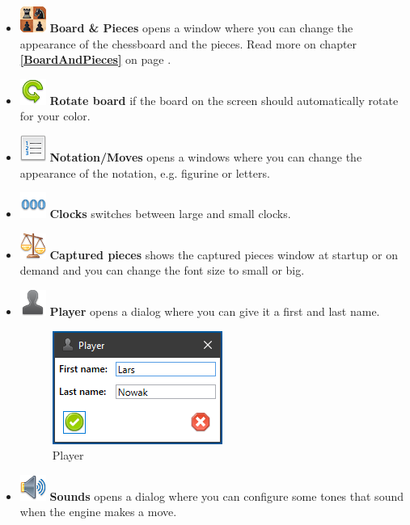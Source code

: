 \documentclass[11pt,a4paper]{article}
\begin{document}
\begin{itemize}
	\item  \includegraphics[scale=0.9]{Board2DPieces32.png} \textbf{Board \& Pieces} opens a window where you can change the appearance of the chessboard and the pieces.  Read more on chapter \textbf{\ref{BoardAndPieces}  } on page \pageref{BoardAndPieces}.
	\item \includegraphics[scale=0.5]{arrow_rotate_anticlockwise.png}  \textbf{Rotate board} if the board on the screen should automatically rotate for your color.
	\item  \includegraphics[scale=0.5]{text_list_numbers.png} \textbf{Notation/Moves} opens a windows where you can change the appearance of the notation, e.g. figurine or letters.
	\item  \includegraphics[scale=0.5]{digit_separator.png}  \textbf{Clocks} switches between large and small clocks.
	\item  \includegraphics[scale=0.5]{balance_unbalance.png}  \textbf{Captured pieces} shows the captured pieces window at startup or on demand and you can change the font size to small or big.
	\item  \includegraphics[scale=0.5]{user_silhouette.png}  \textbf{Player} opens a dialog where you can give it a first and last name.	
    \begin{figure}[H]
	   \centering
    	\includegraphics[scale=1.0]{Player.png}
	    \caption{Player}
 	   \label{fig:Player}
	\end{figure}	
	\item  \includegraphics[scale=0.5]{sound.png}  \textbf{Sounds} opens a dialog where you can configure some tones that sound when the engine makes a move.
	

\end{itemize}
\end{document}
